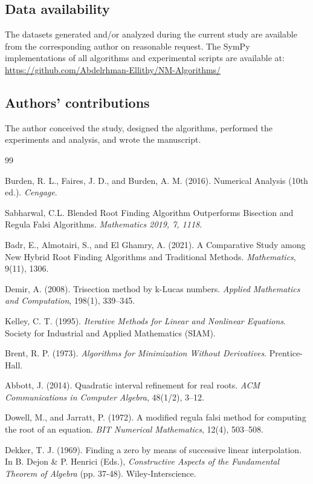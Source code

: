 \documentclass[amsmath, amssymb, aps]{revtex4-2}
\begin{document}
\subsection{Data availability}\label{sec:dataavailability}
The datasets generated and/or analyzed during the current study are available from the corresponding author on reasonable request. The SymPy implementations of all algorithms and experimental scripts are available at: \url{https://github.com/Abdelrhman-Ellithy/NM-Algorithms/}

\subsection{Authors’ contributions}
The author conceived the study, designed the algorithms, performed the experiments and analysis, and wrote the manuscript.

\begin{thebibliography}{99}

Burden, R. L., Faires, J. D., and Burden, A. M. (2016). Numerical Analysis (10th ed.). \textit{Cengage}.

Sabharwal, C.L. Blended Root Finding Algorithm Outperforms Bisection and Regula Falsi Algorithms. \textit{ Mathematics 2019, 7, 1118}.
    
Badr, E., Almotairi, S., and El Ghamry, A. (2021). A Comparative Study among New Hybrid Root Finding Algorithms and Traditional Methods. \textit{Mathematics}, 9(11), 1306.

Demir, A. (2008). Trisection method by k-Lucas numbers. \textit{Applied Mathematics and Computation}, 198(1), 339--345.

Kelley, C. T. (1995). \textit{Iterative Methods for Linear and Nonlinear Equations}. Society for Industrial and Applied Mathematics (SIAM).
    
Brent, R. P. (1973). \textit{Algorithms for Minimization Without Derivatives}. Prentice-Hall.
                    
Abbott, J. (2014). Quadratic interval refinement for real roots. \textit{ACM Communications in Computer Algebra}, 48(1/2), 3--12.
    
Dowell, M., and Jarratt, P. (1972). A modified regula falsi method for computing the root of an equation. \textit{BIT Numerical Mathematics}, 12(4), 503--508.
    
Dekker, T. J. (1969). Finding a zero by means of successive linear interpolation. In B. Dejon \& P. Henrici (Eds.), \textit{Constructive Aspects of the Fundamental Theorem of Algebra} (pp. 37-48). Wiley-Interscience.

\end{thebibliography}
\end{document}
